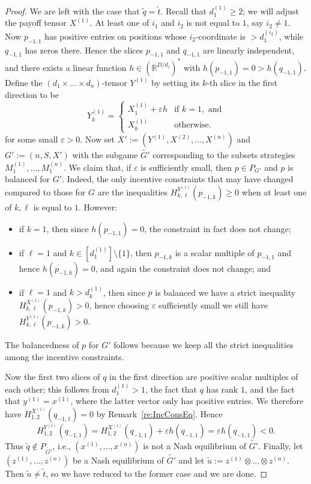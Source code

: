 \documentclass[10pt,a4paper]{amsart}
\newcommand{\RR}{{\mathbb R}}
\renewcommand{\tilde}[1]{\widetilde{#1}}
\begin{document}
\begin{proof}
We are left with the case that $\tilde{q} = \tilde{t}$. Recall that $d^{(1)}_1 \geq 2$; we will adjust the payoff tensor $X^{(1)}$. 
At least one of $i_1$ and $i_2$ is not equal to $1$, say $i_2 \neq 1$. Now 
$p_{-1,1}$ has positive entries on positions whose $i_2$-coordinate
is $>d^{(i_2)}_1$, while $q_{-1,1}$ has zeros there. Hence the 
slices $p_{-1,1}$ and $q_{-1,1}$ are linearly independent, and there
exists a linear function $h \in (\RR^{D/d_i})^*$ with 
$h(p_{-1,1})=0>h(q_{-1,1})$. Define the
$(d_1 \times \dots \times d_n)$-tensor $Y^{(1)}$ by setting its $k$-th slice
in the first direction to be 
\[Y^{(1)}_k= \begin{cases}
    X^{(1)}_1 + \varepsilon h & \text{if } k=1, \text{ and}\\
    X^{(1)}_k & \text{otherwise.}
\end{cases} 
\] for some small $\varepsilon>0$. Now set $X':=(Y^{(1)},X^{(2)}, \dots,
X^{(n)})$ and $G':=(n,S,X')$ with the subgame $\tilde{G'}$ corresponding
to the subsets strategies $M^{(1)}_1, \dots, M^{(n)}_1$. We claim that, if
$\varepsilon$ is sufficiently small, then $p \in P_{G'}$ and $p$ is balanced
for $G'$. Indeed, the only incentive constraints that may have changed
compared to those for $G$ are the inequalities
$H^{Y^{(1)}}_{k,\ell}(p_{-1,k})
\geq 0$ when at least one of $k,\ell$ is equal to $1$. However:
\begin{itemize} 
\item if $k=1$, then since $h(p_{-1,1})=0$,
the constraint in fact does not change; 
\item if $\ell=1$ and $k \in [d^{(1)}_1] \setminus \{1\}$, then $p_{-1,k}$ is a scalar multiple of
$p_{-1,1}$ and hence $h(p_{-1,k})=0$, and again the constraint does
not change; and 
\item if $\ell=1$ and $k>d^{(1)}_k$, then since $p$ is balanced we have
a strict inequality $H^{X^{(1)}}_{k,\ell}(p_{-1,k})>0$, hence
choosing $\varepsilon$
sufficiently small we still have $H^{Y^{(1)}}_{k,\ell}(p_{-1,k})>0$. 
\end{itemize}
The balancedness of $p$ for $G'$ follows because we keep all the
strict inequalities among the incentive constraints. 

Now the first two slices of $q$ in the first direction are positive
scalar multiples of each other; this follows from 
$d^{(1)}_1>1$, the fact that $q$
has rank $1$, and the fact that $y^{(1)}=x^{(1)}$, where the latter vector
only has positive entries. We therefore have
$H^{X^{(1)}}_{1,2}(q_{-1,1})=0$ by Remark~\ref{re:IncConsEq}. Hence
\[ H^{Y^{(1)}}_{1,2}(q_{-1,1})=H^{X^{(1)}}_{1,2}(q_{-1,1})+\varepsilon h(q_{-1,1})= \varepsilon h(q_{-1,1})<0.\] Thus $\tilde{q} \not\in P_{\tilde{G'}}$, i.e., $(x^{(1)},\dots, x^{(n)})$ is not a Nash equilibrium of $\tilde{G'}$. Finally, let $(z^{(1)}, \dots, z^{(n)})$ be a Nash equilibrium of $\tilde{G'}$ and let $\tilde{u}:=z^{(1)} \otimes \dots \otimes z^{(n)}$. Then $\tilde{u} \neq \tilde{t}$, so we have reduced to the former case and we are done.
\end{proof}
\end{document}
